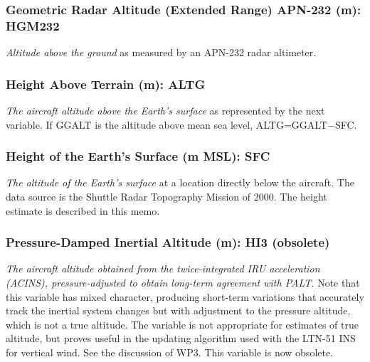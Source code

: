 \documentclass[
]{book}
\begin{document}
\hypertarget{hgm-232}{%
\subsubsection*{Geometric Radar Altitude (Extended Range) APN-232 (m): HGM232}\label{hgm-232}}

\emph{Altitude above the ground} as measured by an APN-232 radar altimeter.

\hypertarget{altg}{%
\subsubsection*{Height Above Terrain (m): ALTG}\label{altg}}

\emph{The aircraft altitude above the Earth's surface} as represented by the next variable. If GGALT is the altitude above mean sea level, ALTG=GGALT{−}SFC.

\hypertarget{sfc}{%
\subsubsection*{Height of the Earth's Surface (m MSL): SFC}\label{sfc}}

\emph{The altitude of the Earth's surface} at a location directly below the aircraft. The data source is the Shuttle Radar Topography Mission of 2000. The height estimate is described in this memo.

\hypertarget{hi3}{%
\subsubsection*{Pressure-Damped Inertial Altitude (m): HI3 (obsolete)}\label{hi3}}

\emph{The aircraft altitude obtained from the twice-integrated IRU acceleration (ACINS), pressure-adjusted to obtain long-term agreement with PALT.} Note that this variable has mixed character, producing short-term variations that accurately track the inertial system changes but with adjustment to the pressure altitude, which is not a true altitude. The variable is not appropriate for estimates of true altitude, but proves useful in the updating algorithm used with the LTN-51 INS for vertical wind. See the discussion of WP3. This variable is now obsolete.
\end{document}
